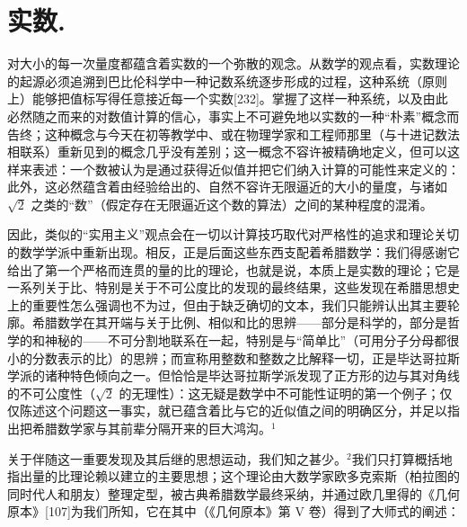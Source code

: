 \chapter{实数.}

对大小的每一次量度都蕴含着实数的一个弥散的观念。从数学的观点看，实数理论的起源必须追溯到巴比伦科学中一种记数系统逐步形成的过程，这种系统（原则上）能够把值标写得任意接近每一个实数{[}232{]}。掌握了这样一种系统，以及由此必然随之而来的对数值计算的信心，事实上不可避免地以实数的一种“朴素”概念而告终；这种概念与今天在初等教学中、或在物理学家和工程师那里（与十进记数法相联系）重新见到的概念几乎没有差别；这一概念不容许被精确地定义，但可以这样来表述：一个数被认为是通过获得近似值并把它们纳入计算的可能性来定义的：此外，这必然蕴含着由经验给出的、自然不容许无限逼近的大小的量度，与诸如 \(\sqrt{2}\) 之类的“数”（假定存在无限逼近这个数的算法）之间的某种程度的混淆。

因此，类似的“实用主义”观点会在一切以计算技巧取代对严格性的追求和理论关切的数学学派中重新出现。相反，正是后面这些东西支配着希腊数学：我们得感谢它给出了第一个严格而连贯的量的比的理论，也就是说，本质上是实数的理论；它是一系列关于比、特别是关于不可公度比的发现的最终结果，这些发现在希腊思想史上的重要性怎么强调也不为过，但由于缺乏确切的文本，我们只能辨认出其主要轮廓。希腊数学在其开端与关于比例、相似和比的思辨——部分是科学的，部分是哲学的和神秘的——不可分割地联系在一起，特别是与“简单比”（可用分子分母都很小的分数表示的比）的思辨；而宣称用整数和整数之比解释一切，正是毕达哥拉斯学派的诸种特色倾向之一。但恰恰是毕达哥拉斯学派发现了正方形的边与其对角线的不可公度性（\(\sqrt{2}\) 的无理性）：这无疑是数学中不可能性证明的第一个例子；仅仅陈述这个问题这一事实，就已蕴含着比与它的近似值之间的明确区分，并足以指出把希腊数学家与其前辈分隔开来的巨大鸿沟。\(^{1}\)

关于伴随这一重要发现及其后继的思想运动，我们知之甚少。\(^{2}\)我们只打算概括地指出量的比理论赖以建立的主要思想；这个理论由大数学家欧多克索斯（柏拉图的同时代人和朋友）整理定型，被古典希腊数学最终采纳，并通过欧几里得的《几何原本》{[}107{]}为我们所知，它在其中（《几何原本》第 V 卷）得到了大师式的阐述：

